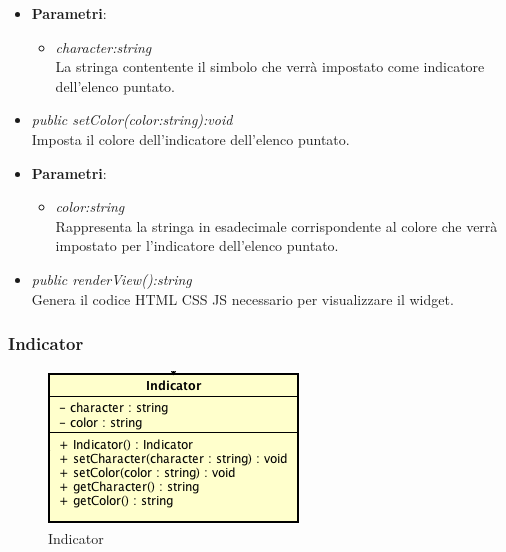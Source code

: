 \begin{itemize}
\begin{itemize}
		\item{\textbf{Parametri}: \begin{itemize}
		\item \textit{character:string}\\
		La stringa contentente il simbolo che verrà impostato come indicatore dell'elenco puntato.
		\end{itemize}}
	\item \textit{public setColor(color:string):void}\\
	Imposta il colore dell'indicatore dell'elenco puntato.
		\item{\textbf{Parametri}: \begin{itemize}
		\item \textit{color:string}\\
		Rappresenta la stringa in esadecimale corrispondente al colore che verrà impostato per l'indicatore dell'elenco puntato.
		\end{itemize}}
	\item \textit{public renderView():string}\\
	Genera il codice HTML CSS JS necessario per visualizzare il widget.
	\end{itemize}
\end{itemize}

\subsubsection{Indicator}

\label{Indicator}
\begin{figure}[ht]
	\centering
	\includegraphics[scale=0.5]{Sezioni/SottosezioniST/img/Indicator.png}
	\caption{Indicator}
\end{figure}

